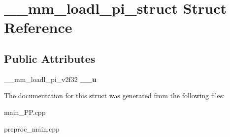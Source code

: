 \hypertarget{struct____mm__loadl__pi__struct}{\section{\+\_\+\+\_\+mm\+\_\+loadl\+\_\+pi\+\_\+struct Struct Reference}
\label{struct____mm__loadl__pi__struct}
}
\subsection*{Public Attributes}
\begin{DoxyCompactItemize}
\item 
\hypertarget{struct____mm__loadl__pi__struct_a09c80e93287b1011fa142d7d884eb960}{\+\_\+\+\_\+mm\+\_\+loadl\+\_\+pi\+\_\+v2f32 {\bfseries \+\_\+\+\_\+u}}\label{struct____mm__loadl__pi__struct_a09c80e93287b1011fa142d7d884eb960}

\end{DoxyCompactItemize}


The documentation for this struct was generated from the following files\+:\begin{DoxyCompactItemize}
\item 
main\+\_\+\+P\+P.\+cpp\item 
preproc\+\_\+main.\+cpp\end{DoxyCompactItemize}
